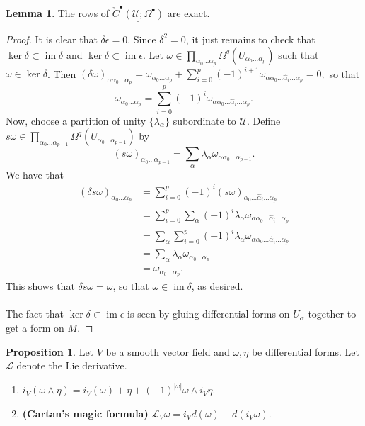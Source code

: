 \documentclass[10pt,letterpaper,cm]{nupset}
\theoremstyle{definition}
\theoremstyle{theorem}
\newtheorem{lemma}[definition]{Lemma}
\newtheorem{prop}[definition]{Proposition}
\theoremstyle{remark}
\newcommand{\U}{\mathcal U}
\newcommand{\1}{\mathbb{1}}
\newcommand{\0}{\vec 0}
\DeclareMathOperator{\im}{im}
\begin{document}
\begin{lemma}
The rows of $\underline{\check{C}^{\bullet}(\U; \Omega^{\bullet})}$ are exact.
\end{lemma}
\begin{proof}
It is clear that  $\delta{\epsilon}=0$. Since $\delta^2 = 0$, it just remains to check that $\ker{\delta} \subset \im{\delta}$ and $\ker{\delta} \subset \im{\epsilon}$.  Let $\omega \in \prod_{\alpha_0 \ldots \alpha_p} \Omega^q(U_{\alpha_0 \ldots \alpha_p})$ such that $\omega \in \ker{\delta}$. Then $(\delta{\omega})_{\alpha \alpha_0 \ldots \alpha_p} =\omega_{\alpha_0 \ldots \alpha_p} + \sum_{i=0}^p ({-}1)^{i+1} \omega_{\alpha \alpha_0\ldots \hat{\alpha}_i\ldots \alpha_p} = 0, $ so that $$\omega_{\alpha_0 \ldots \alpha_p}  =  \sum_{i=0}^p ({-}1)^{i} \omega_{\alpha \alpha_0\ldots \hat{\alpha}_i\ldots \alpha_p}   .$$ 
Now, choose a partition of unity $\{\lambda_{\alpha}\}$ subordinate to $\U$. Define $s{\omega} \in \prod_{\alpha_0 \ldots \alpha_{p-1}} \Omega^q(U_{\alpha_0 \ldots \alpha_{p-1}})$ by $$(s{\omega})_{\alpha_0 \ldots \alpha_{p-1}} = \sum_{\alpha} \lambda_{\alpha} \omega_{\alpha \alpha_0 \ldots \alpha_{p-1}}   .$$ We have that
\begin{align*}
(\delta{s\omega})_{\alpha_0 \ldots \alpha_p}  & = \sum_{i=0}^p ({-}1)^i (s\omega)_{\alpha_0 \ldots \hat{\alpha}_i \ldots \alpha_p}
\\ &  = \sum_{i=0}^p \sum_{\alpha} ({-}1)^i \lambda_{\alpha} \omega_{\alpha \alpha_0 \ldots \hat{\alpha}_i \ldots \alpha_p}
\\ & = \sum_{\alpha} \sum_{i=0}^p ({-}1)^i \lambda_{\alpha} \omega_{\alpha \alpha_0 \ldots \hat{\alpha}_i \ldots \alpha_p}
\\ & =  \sum_{\alpha} \lambda_{\alpha}\omega_{\alpha_0 \ldots \alpha_p} 
\\ & = \omega_{\alpha_0 \ldots \alpha_p}
. \end{align*}
This shows that $\delta{s{\omega}} =\omega$, so that $\omega \in \im{\delta}$, as desired. \\ \\
 The fact that $\ker{\delta} \subset \im{\epsilon}$ is seen by gluing differential forms on $U_{\alpha}$ together to get a form on $M$.
\end{proof}

\begin{prop} Let $V$ be a smooth vector field and $\omega, \eta$ be differential forms. Let $\mathcal{L}$ denote the Lie derivative.
\begin{enumerate} 
\item  $i_V(\omega \wedge \eta) = i_V (\omega) + \eta  +({-}1)^{|\omega|}\omega \wedge i_V{\eta}.$
\item {\textbf{(Cartan's magic formula)}}
$\mathcal{L}_V{\omega} = i_V{d(\omega)} + d(i_V{\omega}).$
\end{enumerate}
\end{prop}
\end{document}
